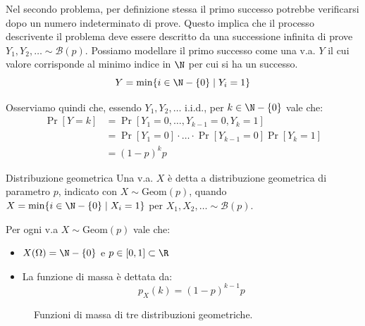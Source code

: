 \documentclass[a4paper, 12pt]{report}
\begin{document}
    Nel secondo problema, per definizione stessa il primo successo potrebbe verificarsi dopo un numero indeterminato di prove. Questo implica che il processo descrivente il problema deve essere descritto da una successione infinita di prove $Y_1, Y_2, \ldots \sim \mathcal{B}(p)$. Possiamo modellare il primo successo come una v.a. $Y$ il cui valore corrisponde al minimo indice in $\N$ per cui si ha un successo.
    \[Y = \min\{i \in \N-\{0\} \mid Y_i = 1\}\]

    Osserviamo quindi che, essendo $Y_1, Y_2, \ldots$ i.i.d., per $k \in \N-\{0\}$ vale che:
    \[\begin{split}
        \Pr[Y = k] &= \Pr[Y_1 = 0, \ldots, Y_{k-1} = 0, Y_k = 1] \\
        &= \Pr[Y_1 = 0] \cdot \ldots \cdot \Pr[Y_{k-1} = 0] \Pr[Y_k = 1]\\
        &= (1-p)^k p
    \end{split}\]

    \begin{frameddefn}{Distribuzione geometrica}
        Una v.a. $X$ è detta a distribuzione geometrica di parametro $p$, indicato con $X \sim \mathrm{Geom}(p)$, quando $X = \min\{i \in \N-\{0\} \mid X_i = 1\}$ per $X_1, X_2, \ldots \sim \mathcal{B}(p)$.

        Per ogni v.a $X \sim \mathrm{Geom}(p)$ vale che:
        \begin{itemize}
            \item $X(\Omega) = \N-\{0\}$ e $p \in [0,1] \subset \R$
            \item La funzione di massa è dettata da:
            \[p_X(k) = (1-p)^{k-1} p\]
        \end{itemize}
    \end{frameddefn}

    \begin{figure}[H]
        \centering

        \caption{Funzioni di massa di tre distribuzioni geometriche.}
    \end{figure}
\end{document}
